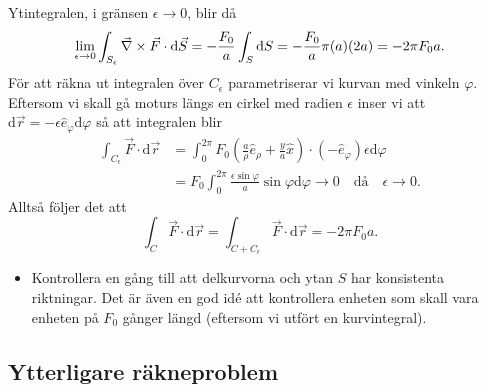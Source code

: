 \documentclass[%
oneside,                 %
final,                   %
10pt]{article}
\newenvironment{notice_mdfboxadmon}[1][]{
\begin{notice_mdfboxmdframed}[frametitle=#1]
}
{
\end{notice_mdfboxmdframed}
}
\begin{document}
\begin{notice_mdfboxadmon}
Ytintegralen, i gränsen $\epsilon \to 0$, blir då
\begin{equation}
  \lim_{\epsilon \to 0} \int_{S_\epsilon} \vec{\nabla} \times \vec{F} \cdot \mbox{d}\vec{S} = -\frac{F_0}{a} \int_S \mbox{d}S
= - \frac{F_0}{a} \pi (a) (2a) = -2\pi F_0 a.
\end{equation}
För att räkna ut integralen över $C_\epsilon$ parametriserar vi kurvan med vinkeln $\varphi$. Eftersom vi skall gå moturs längs en cirkel med radien $\epsilon$ inser vi att $\mbox{d}\vec{r} = - \epsilon \hat{e}_\varphi \mbox{d}\varphi$ så att integralen blir
\begin{align}
  \int_{C_\epsilon} \vec{F}\cdot \mbox{d}\vec{r} &= \int_0^{2\pi} F_0 
\left(\frac{a}{\rho} \hat{e}_\rho + \frac{y}{a} \hat{x} \right) \cdot
\left(-\hat{e}_\varphi \right) \epsilon \mbox{d}\varphi \nonumber \\
&= F_0 \int_0^{2\pi} \frac{\epsilon \sin \varphi}{a} \sin
\varphi \mbox{d} \varphi \to 0 \quad \mbox{då} \quad \epsilon \to 0.
\end{align}
Alltså följer det att 
\begin{equation}
\int_C \vec{F} \cdot \mbox{d}\vec{r} = \int_{C+C_\epsilon} \vec{F}\cdot \mbox{d}\vec{r} =
-2\pi F_0 a.
\end{equation}
\begin{itemize}
\item Kontrollera en gång till att delkurvorna och ytan $S$ har konsistenta riktningar. Det är även en god idé att kontrollera enheten som skall vara enheten på $F_0$ gånger längd (eftersom vi utfört en kurvintegral).
\end{itemize}

\noindent
\end{notice_mdfboxadmon} %



\subsection*{Ytterligare räkneproblem}
\end{document}
